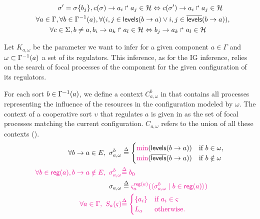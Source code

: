 \begin{property}
{\begin{align*}
\begin{split}
      \\&\qquad\qquad
    \sigma' = \sigma\{b_j\},
    c(\sigma)\rightarrow a_i\Rsh a_j \in \mathcal{H} \Leftrightarrow
    c(\sigma')\rightarrow a_i\Rsh a_j \in \mathcal{H}
  \end{split}\\
  \begin{split}
    & \forall a \in \Gamma, \forall b \in \Gamma^{-1}(a),
      \forall (i,j \in \mathsf{levels}(b\rightarrow a) \vee i,j \in \overline{\mathsf{levels}}(b\rightarrow a)), \\
    & \qquad \forall c \in \Sigma, b \neq a,
      b_i\rightarrow a_k\Rsh a_l \in \mathcal{H} \Leftrightarrow
      b_j\rightarrow a_k\Rsh a_l \in \mathcal{H}
  \end{split}
\end{align*}
}
\end{property}

Let $K_{a,\omega}$ be the parameter we want to infer for a given component $a \in \Gamma$
and $\omega \subset \Gamma^{-1}(a)$ a set of its regulators.
This inference, as for the IG inference, relies on the search of focal processes of the component for the given configuration of its regulators.

For each sort $b \in \Gamma^{-1}(a)$, we define a context $C^b_{a,\omega}$ in  that contains all processes representing the influence of the resources in the configuration modeled by $\omega$.
The context of a cooperative sort $\upsilon$ that regulates $a$ is given in
 as the set of focal processes matching the current configuration.
$C_{a,\omega}$ refers to the union of all these contexts ().
\begin{align}
  \label{eq:param_context}
  \forall b\rightarrow a\in E,~
  \sigma_{a,\omega}^b & \stackrel{\Delta}= \begin{cases}
    \textcolor{magenta}{\min}(\mathsf{levels}(b\rightarrow a)) & \text{if $b \in \omega$,}\\
    \textcolor{magenta}{\min}(\overline{\mathsf{levels}}(b\rightarrow a)) & \text{if $b \notin \omega$}
  \end{cases}
  \\
  \textcolor{magenta}{
  \forall b\in\mathsf{reg}({a}), b\rightarrow a\notin E,~
  \sigma_{a,\omega}^b} & \textcolor{magenta}{\stackrel{\Delta}= b_0}
  \\
  \sigma_{a,\omega} & \stackrel{\Delta}=
  \textcolor{magenta}{\varsigma_a^{\mathsf{reg}({a})}(
  	\langle \sigma^b_{a,\omega} \mid  b\in\mathsf{reg}({a}) \rangle)}
  \label{eq:K-ctx}
  \\
  \textcolor{magenta}{
  \forall a\in\Gamma,~
  S_a(\varsigma)} &\textcolor{magenta}{\stackrel{\Delta}=
	\begin{cases}
	\{a_i\} & \text{if }a_i\in \varsigma\\
	L_a & \text{otherwise.}
	\end{cases}}
\end{align}

